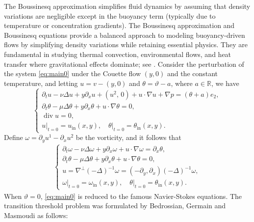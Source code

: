 \documentclass[reqno, 12pt]{amsart} %
\theoremstyle{plain} %
\theoremstyle{definition}
\theoremstyle{remark}
\numberwithin{equation}{section} %
\newcommand{\px}{\partial_x}
\begin{document}
The Boussinesq approximation simplifies fluid dynamics by assuming that density variations are negligible except in the buoyancy term (typically due to temperature or concentration gradients). The Boussinesq approximation and Boussinesq equations provide a balanced approach to modeling buoyancy-driven flows by simplifying density variations while retaining essential physics. They are fundamental in studying thermal convection, environmental flows, and heat transfer where gravitational effects dominate; see \cite{ZZ2023, DWZ2021}. Consider the perturbation of the system \eqref{eq:main0} under the Couette flow $(y, 0)$ and the constant temperature, and 
letting $u=v-(y, 0)$ and $\theta = \vartheta - a$, where $a\in \mathbb{R}$, we have
	$$
	\left\{\begin{array}{l}
		\partial_t u-\nu \Delta u+y \partial_x u+\left(u^2,\, 0\right)+u \cdot \nabla u+\nabla p  =   (\theta + a)e_2,\\
		\partial_t \theta -\mu \Delta \theta +y \partial_x \theta  +  u \cdot \nabla \theta  = 0,  \\
		\operatorname{div} u=0, \\
		\left.u\right|_{t=0}=u_{\text {in}}(x, y),\quad \left.\theta \right|_{t=0}= \theta_{\text{in}}(x, y).
	\end{array}\right.
	$$
	Define $\omega=\partial_y u^1-\partial_x u^2$ be the vorticity, and it follows that
	\begin{equation}\begin{aligned} \label{eq:main}
			\left\{\begin{array}{l}
				\partial_t \omega-\nu \Delta \omega+y \partial_x \omega+u \cdot \nabla \omega = \px \theta,  \\
				\partial_t \theta -\mu \Delta \theta +y \partial_x \theta  +  u \cdot \nabla \theta  = 0,  \\
				u=\nabla^{\perp}(-\Delta)^{-1} \omega=\left(-\partial_y, \partial_x\right)(-\Delta)^{-1} \omega, \\
				\left.\omega\right|_{t=0}=\omega_{\mathrm{in}}(x, y) ,\quad \left.\theta \right|_{t=0}= \theta_{\mathrm{in}}(x, y).
			\end{array}\right.	
	\end{aligned}\end{equation}
    When $\vartheta=0$, \eqref{eq:main0} is reduced to the famous Navier-Stokes equations.
    The transition threshold problem was formulated by Bedrossian, Germain and Masmoudi \cite{BGM2019} as follows:
\end{document}
